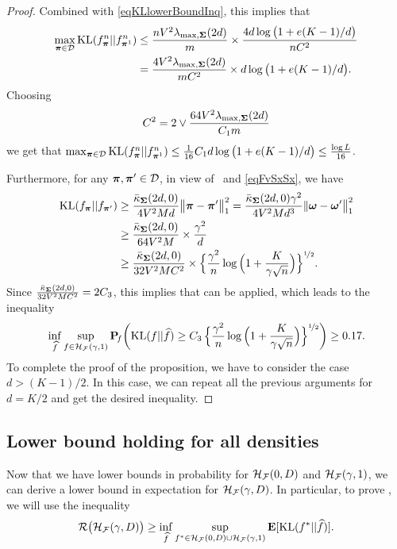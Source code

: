 \begin{proof}
	Combined with \cref{eqKLlowerBoundInq}, this implies that
	\begin{align}
	\max_{\boldsymbol \pi\in\mathcal D}{\rm KL}(f^n_{\boldsymbol \pi}||f^n_{\boldsymbol \pi^1})
	&\leq \frac{nV^2\lambda_{\max,\boldsymbol\Sigma}(2d)}{m}\times \frac{4d\log\big(1+e(K-1)/d\big)}{nC^2}\\
	&= \frac{4V^2\lambda_{\max,\boldsymbol\Sigma}(2d)}{m C^2}\times {d\log\big(1+e(K-1)/d\big)}.
	\end{align}
	Choosing%
	$$
	C^2 = 2\vee\frac{64 V^2\lambda_{\max,\boldsymbol\Sigma}(2d)}{C_1 m}
	$$
	we get that $\max_{\boldsymbol \pi\in\mathcal D}{\rm KL}(f^n_{\boldsymbol \pi}||f^n_{\boldsymbol \pi^1})\le \frac1{16} C_1{d\log\big(1+e(K-1)/d\big)}\le
	\frac{\log L}{16}$.
	
	Furthermore, for any $\boldsymbol \pi,\boldsymbol \pi'\in\mathcal D$, in view of~ and \eqref{eqFvSxSx}, we have
	\begin{align}
	{\rm KL}(f_{\boldsymbol \pi} || f_{\boldsymbol \pi'}) &\geq \frac{\bar\kappa_{\boldsymbol\Sigma}(2d,0)}{4V^2M d} \big{\|}\boldsymbol \pi - \boldsymbol \pi'\big{\|}_1^2
	=\frac{\bar\kappa_{\boldsymbol\Sigma}(2d,0)\gamma^2}{4V^2M d^3} \|\boldsymbol \omega - \boldsymbol \omega'\big\|_1^2\\
	&\geq \frac{\bar\kappa_{\boldsymbol\Sigma}(2d,0)}{64V^2M}\times \frac{\gamma^2}{d}\\
	&\geq \frac{\bar\kappa_{\boldsymbol\Sigma}(2d,0)}{32V^2M C^2}\times 
	\Big\{{\frac{\gamma^2}n\log\Big(1+\frac{K}{\gamma\sqrt{n}}\Big)}\Big\}^{\nicefrac12}.
	\end{align}
	Since $\frac{\bar\kappa_{\boldsymbol\Sigma}(2d,0)}{32V^2M C^2} = 2C_3$, this implies that 
	 can be applied, which leads to the inequality
	\begin{equation}
	\inf_{\widehat f}\sup_{f \in \mathcal H_\mathcal F(\gamma,1)}\mathbf P\!_{f}\bigg({\rm KL}(f||\widehat f)\geq
	C_3\,\Big\{{\frac{\gamma^2}n\log\Big(1+\frac{K}{\gamma\sqrt{n}}\Big)}\Big\}^{\nicefrac12}\bigg)\geq 0.17.
	\end{equation}
	To complete the proof of the proposition, we have to consider the case $d > (K-1)/2$. In this case,
	we can repeat all the previous arguments for $d= K/2$ and get the desired inequality.
\end{proof}

\subsection{Lower bound holding for all densities} %

Now that we have lower bounds in probability for $\mathcal H_\mathcal F(0,D)$ and $\mathcal H_\mathcal F(\gamma,1)$, we can derive a lower bound in expectation for
$\mathcal H_\mathcal F(\gamma,D)$. In particular, to prove ,
we will use the inequality
\begin{equation}\label{eqFvSxSev}
\mathcal R\big(\mathcal H_{\mathcal F}(\gamma,D)\big)  \ge \inf_{\widehat f}
\sup_{f^*\in \mathcal H_\mathcal F(0,D)\cup \mathcal H_\mathcal F(\gamma,1)} \mathbf E[{\rm KL}(f^*||\widehat f)].
\end{equation}



